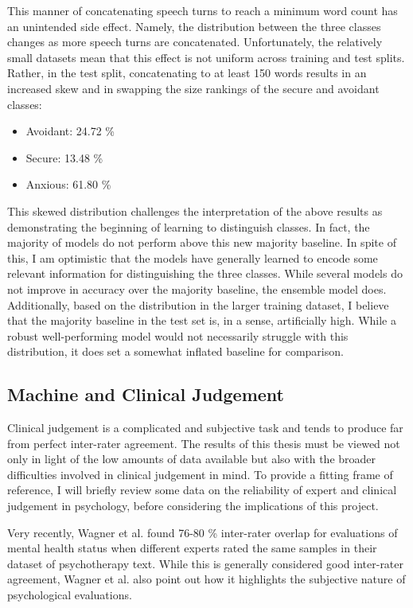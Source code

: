\documentclass[12pt]{report}
\begin{document}
This manner of concatenating speech turns to reach a minimum word count has an unintended side effect.
Namely, the distribution between the three classes changes as more speech turns are concatenated.
Unfortunately, the relatively small datasets mean that this effect is not uniform across training and test splits.
Rather, in the test split, concatenating to at least 150 words results in an increased skew and in swapping the size rankings of the secure and avoidant classes:
\begin{itemize}
    \item Avoidant: 24.72 \%
    \item Secure: 13.48 \%
    \item Anxious: 61.80 \%
\end{itemize}

This skewed distribution challenges the interpretation of the above results as demonstrating the beginning of learning to distinguish classes.
In fact, the majority of models do not perform above this new majority baseline.
In spite of this, I am optimistic that the models have generally learned to encode some relevant information for distinguishing the three classes.
While several models do not improve in accuracy over the majority baseline, the ensemble model does.
Additionally, based on the distribution in the larger training dataset, I believe that the majority baseline in the test set is, in a sense, artificially high.
While a robust well-performing model would not necessarily struggle with this distribution, it does set a somewhat inflated baseline for comparison.

\subsection{Machine and Clinical Judgement}
Clinical judgement is a complicated and subjective task and tends to produce far from perfect inter-rater agreement.
The results of this thesis must be viewed not only in light of the low amounts of data available but also with the broader difficulties involved in clinical judgement in mind.
To provide a fitting frame of reference, I will briefly review some data on the reliability of expert and clinical judgement in psychology, before considering the implications of this project.

Very recently, Wagner et al. \citeyear{Wagner2023} found 76-80 \% inter-rater overlap for evaluations of mental health status when different experts rated the same samples in their dataset of psychotherapy text.
While this is generally considered good inter-rater agreement, Wagner et al. also point out how it highlights the subjective nature of psychological evaluations.
\end{document}
